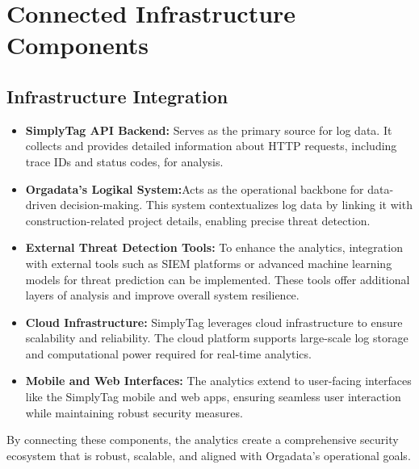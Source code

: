 %
%

\chapter{Connected Infrastructure Components}

\section{Infrastructure Integration}

\begin{itemize}
	\item \textbf{SimplyTag API Backend:} Serves as the primary source for log data. It collects and provides detailed information about HTTP requests, including trace IDs and status codes, for analysis.
	\item \textbf{Orgadata’s Logikal System:}Acts as the operational backbone for data-driven decision-making. This system contextualizes log data by linking it with construction-related project details, enabling precise threat detection.
	\item \textbf{External Threat Detection Tools:} To enhance the analytics, integration with external tools such as SIEM platforms or advanced machine learning models for threat prediction can be implemented. These tools offer additional layers of analysis and improve overall system resilience.
	\item \textbf{Cloud Infrastructure:} SimplyTag leverages cloud infrastructure to ensure scalability and reliability. The cloud platform supports large-scale log storage and computational power required for real-time analytics.
	\item \textbf{Mobile and Web Interfaces:} The analytics extend to user-facing interfaces like the SimplyTag mobile and web apps, ensuring seamless user interaction while maintaining robust security measures.
\end{itemize}

By connecting these components, the analytics create a comprehensive security ecosystem that is robust, scalable, and aligned with Orgadata’s operational goals.